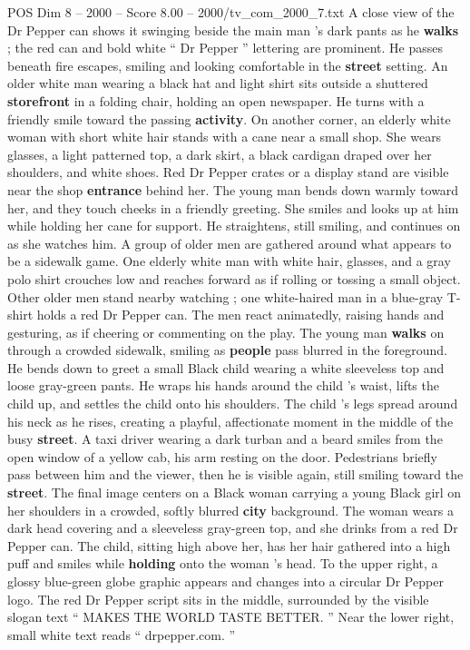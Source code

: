 \begin{textsample}{POS Dim 8 – 2000 – Score 8.00 – 2000/tv\_com\_2000\_7.txt}
A close view of the Dr Pepper can shows it swinging beside the main man ’s dark pants as he \textbf{walks} ; the red can and bold white “ Dr Pepper ” lettering are prominent.
He passes beneath fire escapes, smiling and looking comfortable in the \textbf{street} setting.
An older white man wearing a black hat and light shirt sits outside a shuttered \textbf{storefront} in a folding chair, holding an open newspaper.
He turns with a friendly smile toward the passing \textbf{activity}.
On another corner, an elderly white woman with short white hair stands with a cane near a small shop.
She wears glasses, a light patterned top, a dark skirt, a black cardigan draped over her shoulders, and white shoes.
Red Dr Pepper crates or a display stand are visible near the shop \textbf{entrance} behind her.
The young man bends down warmly toward her, and they touch cheeks in a friendly greeting.
She smiles and looks up at him while holding her cane for support.
He straightens, still smiling, and continues on as she watches him.
A group of older men are gathered around what appears to be a sidewalk game.
One elderly white man with white hair, glasses, and a gray polo shirt crouches low and reaches forward as if rolling or tossing a small object.
Other older men stand nearby watching ; one white-haired man in a blue-gray T-shirt holds a red Dr Pepper can.
The men react animatedly, raising hands and gesturing, as if cheering or commenting on the play.
The young man \textbf{walks} on through a crowded sidewalk, smiling as \textbf{people} pass blurred in the foreground.
He bends down to greet a small Black child wearing a white sleeveless top and loose gray-green pants.
He wraps his hands around the child ’s waist, lifts the child up, and settles the child onto his shoulders.
The child ’s legs spread around his neck as he rises, creating a playful, affectionate moment in the middle of the busy \textbf{street}.
A taxi driver wearing a dark turban and a beard smiles from the open window of a yellow cab, his arm resting on the door.
Pedestrians briefly pass between him and the viewer, then he is visible again, still smiling toward the \textbf{street}.
The final image centers on a Black woman carrying a young Black girl on her shoulders in a crowded, softly blurred \textbf{city} background.
The woman wears a dark head covering and a sleeveless gray-green top, and she drinks from a red Dr Pepper can.
The child, sitting high above her, has her hair gathered into a high puff and smiles while \textbf{holding} onto the woman ’s head.
To the upper right, a glossy blue-green globe graphic appears and changes into a circular Dr Pepper logo.
The red Dr Pepper script sits in the middle, surrounded by the visible slogan text “ MAKES THE WORLD TASTE BETTER. ” Near the lower right, small white text reads “ drpepper.com. ”

\end{textsample}
